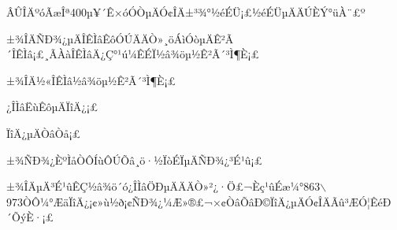 \documentclass[10.5pt,compsoc]{CjC}
\theoremstyle{mystyle}
\begin{document}
\begin{CJK*}{GBK}{song}
{ÂÛÎÄºóÃæÎª400µ¥´Ê×óÓÒµÄÓ¢ÎÄ±³¾°½éÉÜ¡£½éÉÜµÄÄÚÈÝ°üÀ¨£º

±¾ÎÄÑÐ¾¿µÄÎÊÌâÊôÓÚÄÄÒ»¸öÁìÓòµÄÊ²Ã´ÎÊÌâ¡£¸ÃÀàÎÊÌâÄ¿Ç°¹ú¼ÊÉÏ½â¾öµ½Ê²Ã´³Ì¶È¡£

±¾ÎÄ½«ÎÊÌâ½â¾öµ½Ê²Ã´³Ì¶È¡£

¿ÎÌâËùÊôµÄÏîÄ¿¡£

ÏîÄ¿µÄÒâÒå¡£

±¾ÑÐ¾¿ÈºÌåÒÔÍùÔÚÕâ¸ö·½ÏòÉÏµÄÑÐ¾¿³É¹û¡£

±¾ÎÄµÄ³É¹ûÊÇ½â¾ö´ó¿ÎÌâÖÐµÄÄÄÒ»²¿·Ö£¬Èç¹ûÉæ¼°863$\backslash
$973ÒÔ¼°ÆäÏîÄ¿¡¢»ù½ð¡¢ÑÐ¾¿¼Æ»®£¬×¢ÒâÕâÐ©ÏîÄ¿µÄÓ¢ÎÄÃû³ÆÓ¦ÊéÐ´ÕýÈ·¡£}

\end{CJK*}
\end{document}
